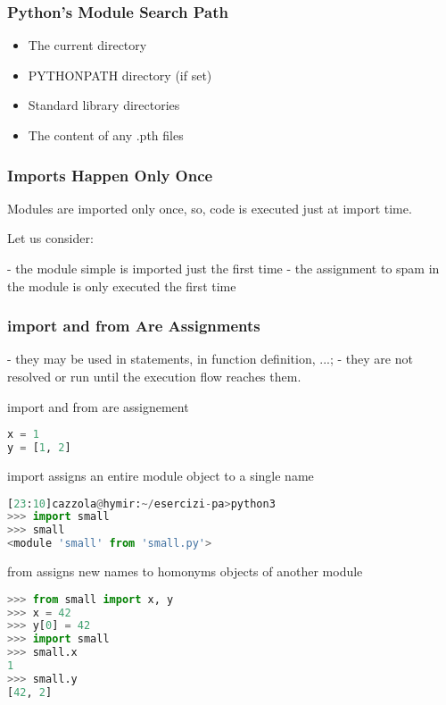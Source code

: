 \subsubsection{Python’s Module Search Path}

\begin{itemize}
  \item The current directory
  \item PYTHONPATH directory (if set)
  \item Standard library directories
  \item The content of any .pth files
\end{itemize}

\subsubsection{Imports Happen Only Once}

Modules are imported only once, so, code is executed just at import time.

Let us consider:
\begin{center}
\end{center}

- the module simple is imported just the first time
- the assignment to spam in the module is only executed the first time

\subsubsection{import and from Are Assignments}

- they may be used in statements, in function definition, ...;
- they are not resolved or run until the execution flow reaches them.

import and from are assignement
\begin{lstlisting}[language=Python]
x = 1
y = [1, 2]
\end{lstlisting}

import assigns an entire module object to a single name

\begin{lstlisting}[language=Python]
[23:10]cazzola@hymir:~/esercizi-pa>python3
>>> import small
>>> small
<module 'small' from 'small.py'>
\end{lstlisting}

from assigns new names to homonyms objects of another module

\begin{lstlisting}[language=Python]
>>> from small import x, y
>>> x = 42
>>> y[0] = 42
>>> import small
>>> small.x
1
>>> small.y
[42, 2]
\end{lstlisting}

